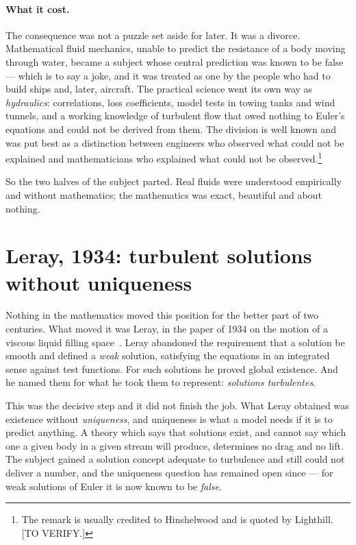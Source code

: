 \documentclass[11pt]{article}
\begin{document}
\paragraph{What it cost.} The consequence was not a puzzle set aside for later. It was a divorce.
Mathematical fluid mechanics, unable to predict the resistance of a body moving through water, became
a subject whose central prediction was known to be false --- which is to say a joke, and it was
treated as one by the people who had to build ships and, later, aircraft. The practical science went
its own way as \emph{hydraulics}: correlations, loss coefficients, model tests in towing tanks and
wind tunnels, and a working knowledge of turbulent flow that owed nothing to Euler's equations and
could not be derived from them. The division is well known and was put best as a distinction between
engineers who observed what could not be explained and mathematicians who explained what could not be
observed.\footnote{The remark is usually credited to Hinshelwood and is quoted by Lighthill.
[TO VERIFY.]}

So the two halves of the subject parted. Real fluids were understood empirically and without
mathematics; the mathematics was exact, beautiful and about nothing.

\section{Leray, 1934: turbulent solutions without uniqueness}\label{sec:leray}

Nothing in the mathematics moved this position for the better part of two centuries. What moved it
was Leray, in the paper of 1934 on the motion of a viscous liquid filling space~\cite{leray}. Leray
abandoned the requirement that a solution be smooth and defined a \emph{weak} solution, satisfying
the equations in an integrated sense against test functions. For such solutions he proved global
existence. And he named them for what he took them to represent: \emph{solutions turbulentes}.

This was the decisive step and it did not finish the job. What Leray obtained was existence without
\emph{uniqueness}, and uniqueness is what a model needs if it is to predict anything. A theory which
says that solutions exist, and cannot say which one a given body in a given stream will produce,
determines no drag and no lift. The subject gained a solution concept adequate to turbulence and
still could not deliver a number, and the uniqueness question has remained open since --- for weak
solutions of Euler it is now known to be \emph{false}.
\end{document}
